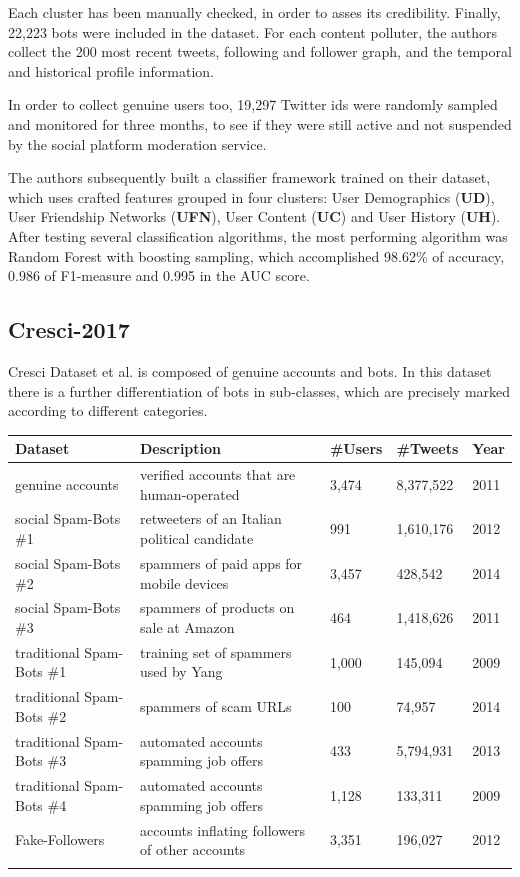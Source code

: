 Each cluster has been manually checked, in order to asses its credibility.
Finally, 22,223 bots were included in the dataset.
For each content polluter, the authors collect the 200 most recent tweets, following and follower graph, and the temporal and historical profile information.

In order to collect genuine users too, 19,297 Twitter ids were randomly sampled and monitored  for three months, to see if they were still active and not suspended by the social platform moderation service.

The authors subsequently built a classifier framework trained on their dataset, which uses crafted features grouped in four clusters:
User Demographics (\textbf{UD}), User Friendship Networks (\textbf{UFN}), User Content (\textbf{UC}) and User History (\textbf{UH}).
After testing several classification algorithms, the most performing algorithm was Random Forest with boosting sampling, which accomplished 98.62\% of accuracy, 0.986 of F1-measure and 0.995 in the AUC score.

\subsection{Cresci-2017}
Cresci Dataset et al. \cite{Cresci} is composed of genuine accounts and bots. In this dataset there is a further differentiation of bots in sub-classes, which are precisely marked according to different categories.

\tiny
\begin{center}
\begin{tabular}{lllll}
	Dataset&Description&\#Users&\#Tweets&Year\\ \hline\hline
	genuine accounts&
	verified accounts that are human-operated&
	3,474&
	8,377,522
	&2011\\
	social Spam-Bots \#1&
	retweeters of an Italian political candidate&
	991&
	1,610,176&
	2012 \\
	social Spam-Bots \#2&
	spammers of paid apps for mobile devices&
	3,457&
	428,542&
	2014 \\
	social Spam-Bots \#3&
	spammers of products on sale at	Amazon&
	464&
	1,418,626&
	2011 \\
	traditional Spam-Bots \#1&
	training set of spammers used by Yang \cite{Yang}&
	1,000&
	145,094&
	2009 \\
	traditional Spam-Bots \#2&
	spammers of scam URLs&
	100&
	74,957&
	2014 \\
	traditional Spam-Bots \#3&
	automated accounts spamming job offers&
	433&
	5,794,931&
	2013 \\
	traditional Spam-Bots \#4&
	automated accounts spamming job offers&
	1,128&
	133,311&
	2009 \\
	Fake-Followers&
	accounts inflating followers of other accounts&
	3,351&
	196,027&
	2012 \\ \hline\\
	
\end{tabular}
\end{center}

